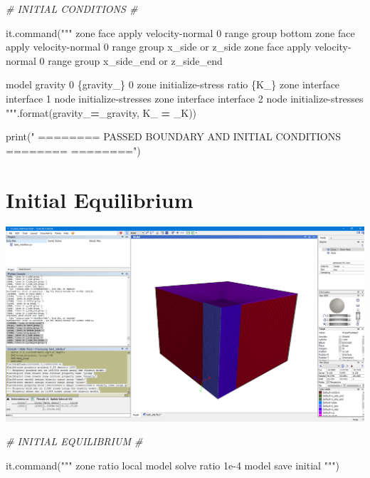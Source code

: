\documentclass[a4paper, nobind]{templates/ociamthesis}
\newenvironment{Shaded}{\begin{snugshade}}{\end{snugshade}}
\newcommand{\BuiltInTok}[1]{#1}
\newcommand{\CommentTok}[1]{\textcolor[rgb]{0.56,0.35,0.01}{\textit{#1}}}
\newcommand{\NormalTok}[1]{#1}
\newcommand{\OperatorTok}[1]{\textcolor[rgb]{0.81,0.36,0.00}{\textbf{#1}}}
\newcommand{\SpecialCharTok}[1]{\textcolor[rgb]{0.00,0.00,0.00}{#1}}
\newcommand{\StringTok}[1]{\textcolor[rgb]{0.31,0.60,0.02}{#1}}
\renewenvironment{Shaded}
{
  \vspace{10pt}%
  \begin{snugshade}%
}{%
  \end{snugshade}%
  \vspace{8pt}%
}
\begin{document}
\begin{Shaded}
\begin{Highlighting}[]
\CommentTok{\# INITIAL CONDITIONS \#}

\NormalTok{it.command(}\StringTok{"""}
\StringTok{zone face apply velocity{-}normal 0 range group \textquotesingle{}bottom\textquotesingle{}}
\StringTok{zone face apply velocity{-}normal 0 range group \textquotesingle{}x\_side\textquotesingle{} or \textquotesingle{}z\_side\textquotesingle{}}
\StringTok{zone face apply velocity{-}normal 0 range group \textquotesingle{}x\_side\_end\textquotesingle{} or \textquotesingle{}z\_side\_end\textquotesingle{}}

\StringTok{model gravity 0 }\SpecialCharTok{\{gravity\_\}}\StringTok{ 0}
\StringTok{zone initialize{-}stress ratio }\SpecialCharTok{\{K\_\}}
\StringTok{zone interface \textquotesingle{}interface 1\textquotesingle{} node initialize{-}stresses}
\StringTok{zone interface \textquotesingle{}interface 2\textquotesingle{} node initialize{-}stresses}
\StringTok{"""}\NormalTok{.}\BuiltInTok{format}\NormalTok{(gravity\_}\OperatorTok{=}\NormalTok{\_gravity, K\_ }\OperatorTok{=}\NormalTok{ \_K))}

\BuiltInTok{print}\NormalTok{(}\StringTok{"               ======== PASSED BOUNDARY AND INITIAL CONDITIONS ========        ========"}\NormalTok{)}
\end{Highlighting}
\end{Shaded}

\hypertarget{initial-equilibrium}{%
\section{Initial Equilibrium}\label{initial-equilibrium}}

\includegraphics[width=1\linewidth]{myfigureeeeee/initial}

\begin{Shaded}
\begin{Highlighting}[]
\CommentTok{\# INITIAL EQUILIBRIUM \#}

\NormalTok{it.command(}\StringTok{"""}
\StringTok{zone ratio local}
\StringTok{model solve ratio 1e{-}4}
\StringTok{model save \textquotesingle{}initial\textquotesingle{}}
\StringTok{"""}\NormalTok{)}
\end{Highlighting}
\end{Shaded}
\end{document}
